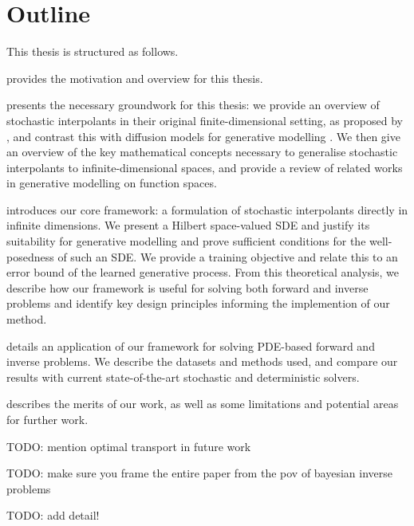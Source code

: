 
\section{Outline}
This thesis is structured as follows.

\textbf{} provides the motivation and overview for this thesis.

\textbf{} presents the necessary groundwork for this thesis: we provide an overview of stochastic interpolants in their original finite-dimensional setting, as proposed by \citet{albergo2023stochasticinterpolantsunifyingframework}, and contrast this with diffusion models for generative modelling \citep{song2021scorebasedgenerativemodelingstochastic}. We then give an overview of the key mathematical concepts necessary to generalise stochastic interpolants to infinite-dimensional spaces, and provide a review of related works in generative modelling on function spaces.

\textbf{} introduces our core framework: a formulation of stochastic interpolants directly in infinite dimensions. We present a Hilbert space-valued SDE and justify its suitability for generative modelling and prove sufficient conditions for the well-posedness of such an SDE. We provide a training objective and relate this to an error bound of the learned generative process. From this theoretical analysis, we describe how our framework is useful for solving both forward and inverse problems and identify key design principles informing the implemention of our method.

\textbf{} details an application of our framework for solving PDE-based forward and inverse problems. We describe the datasets and methods used, and compare our results with current state-of-the-art stochastic and deterministic solvers. %

\textbf{} describes the merits of our work, as well as some limitations and potential areas for further work.

TODO: mention optimal transport in future work

TODO: make sure you frame the entire paper from the pov of bayesian inverse problems

TODO: add detail!


